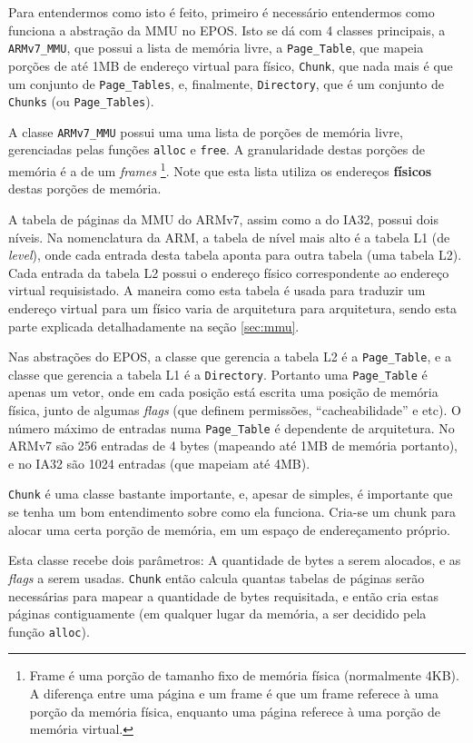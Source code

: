 
Para entendermos como isto é feito, primeiro é necessário entendermos como funciona a abstração da MMU no EPOS. Isto se dá com 4 classes principais, a \verb+ARMv7_MMU+, que possui a lista de memória livre, a \verb+Page_Table+, que mapeia porções de até 1MB de endereço virtual para físico, \verb+Chunk+, que nada mais é que um conjunto de \verb+Page_Tables+, e, finalmente, \verb+Directory+, que é um conjunto de \verb+Chunks+ (ou \verb+Page_Tables+).

A classe \verb+ARMv7_MMU+ possui uma uma lista de porções de memória livre, gerenciadas pelas funções \verb+alloc+ e \verb+free+. A granularidade destas porções de memória é a de um \emph{frames}
\footnote{Frame é uma porção de tamanho fixo de memória física (normalmente 4KB). A diferença entre uma página e um frame é que um frame referece à uma porção da memória física, enquanto uma página referece à uma porção de memória virtual.}.
Note que esta lista utiliza os endereços \textbf{físicos} destas porções de memória.

A tabela de páginas da MMU do ARMv7, assim como a do IA32, possui dois níveis. Na nomenclatura da ARM, a tabela de nível mais alto é a tabela L1 (de \emph{level}), onde cada entrada desta tabela aponta para outra tabela (uma tabela L2).
Cada entrada da tabela L2 possui o endereço físico correspondente ao endereço virtual requisistado. A maneira como esta tabela é usada para traduzir um endereço virtual para um físico varia de arquitetura para arquitetura, sendo esta parte explicada detalhadamente na seção \ref{sec:mmu}.

Nas abstrações do EPOS, a classe que gerencia a tabela L2 é a \verb+Page_Table+, e a classe que gerencia a tabela L1 é a \verb+Directory+. Portanto uma \verb+Page_Table+ é apenas um vetor, onde em cada posição está escrita uma posição de memória física, junto de algumas \emph{flags} (que definem permissões, ``cacheabilidade'' e etc). O número máximo de entradas numa \verb+Page_Table+ é dependente de arquitetura. No ARMv7 são 256 entradas de 4 bytes (mapeando até 1MB de memória portanto), e no IA32 são 1024 entradas (que mapeiam até 4MB).

\verb+Chunk+ é uma classe bastante importante, e, apesar de simples, é importante que se tenha um bom entendimento sobre como ela funciona.
Cria-se um chunk para alocar uma certa porção de memória, em um espaço de endereçamento próprio. 

Esta classe recebe dois parâmetros: A quantidade de bytes a serem alocados, e as \emph{flags} a serem usadas. \verb+Chunk+ então calcula quantas tabelas de páginas serão necessárias para mapear a quantidade de bytes requisitada, e então cria estas páginas contiguamente (em qualquer lugar da memória, a ser decidido pela função \verb+alloc+).

